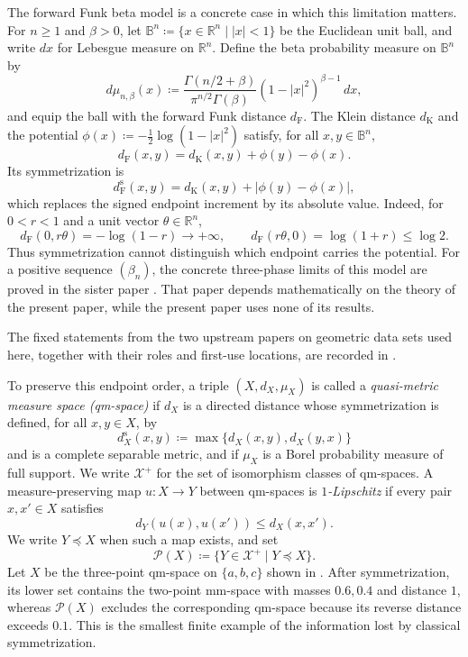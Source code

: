 \documentclass{amsart}
\theoremstyle{plain}
\theoremstyle{definition}
\theoremstyle{remark}
\newcommand{\Xp}{\mathcal{X}^{+}}
\begin{document}
The forward Funk beta model is a concrete case in which this limitation matters. For $n\geq1$ and $\beta>0$, let $\mathbb B^n\coloneqq\{x\in\mathbb R^n\mid |x|<1\}$ be the Euclidean unit ball, and write $dx$ for Lebesgue measure on $\mathbb R^n$. Define the beta probability measure on $\mathbb B^n$ by
\[d\mu_{n,\beta}(x)\coloneqq\frac{\Gamma(n/2+\beta)}{\pi^{n/2}\Gamma(\beta)}(1-|x|^2)^{\beta-1}\,dx,\]
and equip the ball with the forward Funk distance $d_{\mathrm F}$. The Klein distance $d_{\mathrm K}$ and the potential $\phi(x)\coloneqq-\frac12\log(1-|x|^2)$ satisfy, for all $x,y\in\mathbb B^n$,
\[d_{\mathrm F}(x,y)=d_{\mathrm K}(x,y)+\phi(y)-\phi(x).\]
Its symmetrization is
\[d_{\mathrm F}^{\mathrm s}(x,y)=d_{\mathrm K}(x,y)+|\phi(y)-\phi(x)|,\]
which replaces the signed endpoint increment by its absolute value. Indeed, for $0<r<1$ and a unit vector $\theta\in\mathbb R^n$,
\[d_{\mathrm F}(0,r\theta)=-\log(1-r)\longrightarrow+\infty,\qquad d_{\mathrm F}(r\theta,0)=\log(1+r)\leq\log2.\]
Thus symmetrization cannot distinguish which endpoint carries the potential. For a positive sequence $(\beta_n)$, the concrete three-phase limits of this model are proved in the sister paper \cite{finsler-poincare-beta-balls}. That paper depends mathematically on the theory of the present paper, while the present paper uses none of its results.

The fixed statements from the two upstream papers on geometric data sets used here, together with their roles and first-use locations, are recorded in .

To preserve this endpoint order, a triple $(X,d_X,\mu_X)$ is called a \emph{quasi-metric measure space (qm-space)} if $d_X$ is a directed distance whose symmetrization is defined, for all $x,y\in X$, by
\[d_X^{\mathrm s}(x,y)\coloneqq\max\{d_X(x,y),d_X(y,x)\}\]
and is a complete separable metric, and if $\mu_X$ is a Borel probability measure of full support. We write $\Xp$ for the set of isomorphism classes of qm-spaces. A measure-preserving map $u\colon X\to Y$ between qm-spaces is \emph{$1$-Lipschitz} if
every pair $x,x'\in X$ satisfies
\[d_Y(u(x),u(x'))\leq d_X(x,x').\]
We write $Y\preceq X$ when such a map exists, and set
\[\mathcal P(X)\coloneqq\{Y\in\Xp\mid Y\preceq X\}.\]
Let $X$ be the three-point qm-space on $\{a,b,c\}$ shown in . After symmetrization, its lower set contains the two-point mm-space with masses $0.6,0.4$ and distance $1$, whereas $\mathcal P(X)$ excludes the corresponding qm-space because its reverse distance exceeds $0.1$. This is the smallest finite example of the information lost by classical symmetrization.
\end{document}
